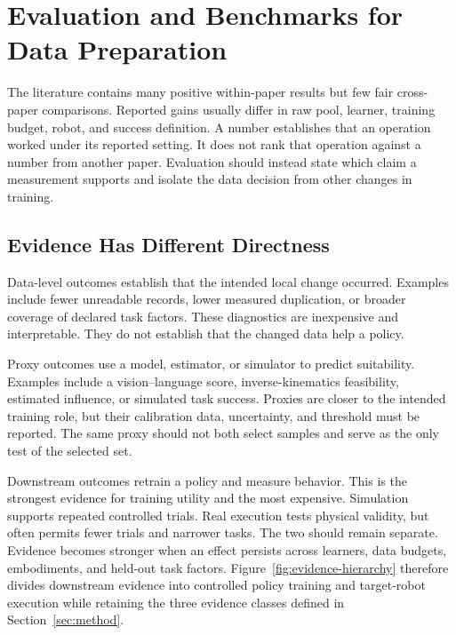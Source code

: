 \section{Evaluation and Benchmarks for Data Preparation}
\label{sec:evaluation}

The literature contains many positive within-paper results but few fair cross-paper comparisons. Reported gains usually differ in raw pool, learner, training budget, robot, and success definition. A number establishes that an operation worked under its reported setting. It does not rank that operation against a number from another paper. Evaluation should instead state which claim a measurement supports and isolate the data decision from other changes in training.

\subsection{Evidence Has Different Directness}

Data-level outcomes establish that the intended local change occurred. Examples include fewer unreadable records, lower measured duplication, or broader coverage of declared task factors. These diagnostics are inexpensive and interpretable. They do not establish that the changed data help a policy.

Proxy outcomes use a model, estimator, or simulator to predict suitability. Examples include a vision--language score, inverse-kinematics feasibility, estimated influence, or simulated task success. Proxies are closer to the intended training role, but their calibration data, uncertainty, and threshold must be reported. The same proxy should not both select samples and serve as the only test of the selected set.

Downstream outcomes retrain a policy and measure behavior. This is the strongest evidence for training utility and the most expensive. Simulation supports repeated controlled trials. Real execution tests physical validity, but often permits fewer trials and narrower tasks. The two should remain separate. Evidence becomes stronger when an effect persists across learners, data budgets, embodiments, and held-out task factors.
Figure~\ref{fig:evidence-hierarchy} therefore divides downstream evidence into controlled policy training and target-robot execution while retaining the three evidence classes defined in Section~\ref{sec:method}.



